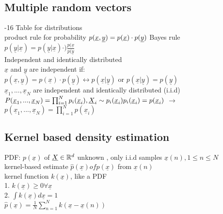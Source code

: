 \subsection{Multiple random vectors}
-16 Table for distributions \\
\textbullet product rule for probability
$p(\underline{x } , \underline{ y } ) = p(\underline{x }) \cdot p( \underline{y }) \\$
\textbullet Bayes rule
$ p( \underline{y } | \underline{x } ) = p( \underline{y } | \underline{x } ) \cdot ) \frac{ p(\underline{x }}{ p(\underline{y }}$ \\
\textbullet Independent and identically distributed \\
$ \underline{x} $ and $ \underline{y}$ are independent if: \\
$p (\underline{x}, \underline{y}) = p (\underline{x}) \cdot p(\underline{y}) \leftrightarrow p(\underline{x}| \underline{y}) $ or $ p(\underline{x} | \underline{y}) = p ( \underline{y})$ \\
$ \underline{x}_1 ,... ,\underline{x}_N$ are independent and identically distributed (i.i.d)\\
$P(\underline{x}_1, ..., \underline{x}_N) = \prod_ {i = 1 }^{N } p_i (\underline{x}_i), \underline{X}_i \sim p_i (\underline{x}_i) \\
p_i (\underline{x}_i ) = p(\underline{x}_i) $
$\rightarrow$  $p(\underline{x}_1 , ..., \underline{x}_N) = \prod_{ i=1 } ^{N } p(\underline{x}_i)$ \\
\subsection{Kernel based density estimation }
PDF: $ p(\underline{x}) $ of $ \underline{X} \in \mathbb R^d $ unknown , only i.i.d samples $ \underline{x}(n), 1 \leq n \leq N$ \\
kernel-based estimate $ \hat { p } (\underline{x}) of p(\underline{x})$ from $ \underline{x}(n)$ \\
kernel function $ k(\underline{x})$, like a PDF \\
1. $ k(\underline{x}) \geq 0 \forall \underline{x}$ \\
2. $\int k(\underline{x}) d \underline{x} = 1$ \\
$ \hat { p } (\underline{x}) = \frac{1}{N} \sum_ {n=1 } ^N k (\underline{x} - \underline{x} (n)) $ \\
 \\

